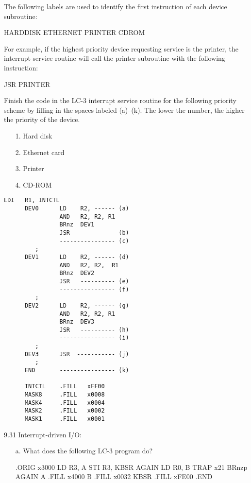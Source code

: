 \documentclass{patt}
\begin{document}
\begin{exercises}
The following labels are used to identify the first instruction of
each device subroutine:
\begin{center}
HARDDISK ETHERNET PRINTER CDROM
\end{center}

For example, if the highest priority device requesting service is the
printer, the interrupt service routine will call the printer
subroutine with the following instruction:
\begin{center}
JSR  PRINTER
\end{center}

Finish the code in the LC-3 interrupt service routine for the
following priority scheme by filling in the spaces labeled (a)--(k).
The lower the number, the higher the priority of the device.
\begin{enumerate}
\item[{\rm 1.}] Hard disk
\item[{\rm 2.}] Ethernet card
\item[{\rm 3.}] Printer
\item[{\rm 4.}] CD-ROM
\end{enumerate}

\begin{Verbatim}[fontsize=\fontsize{9}{10}\selectfont,formatcom=\color{seventyblack}]
                LDI   R1, INTCTL
      DEV0      LD    R2, ------ (a)
                AND   R2, R2, R1
                BRnz  DEV1
                JSR   ---------- (b)
                ---------------- (c)
         ;
      DEV1      LD    R2, ------ (d)
                AND   R2, R2,  R1
                BRnz  DEV2
                JSR   ---------- (e)
                ---------------- (f)
         ;
      DEV2      LD    R2, ------ (g)
                AND   R2, R2, R1
                BRnz  DEV3
                JSR   ---------- (h)
                ---------------- (i)
         ;
      DEV3      JSR  ----------- (j)
         ;
      END       ---------------- (k)

      INTCTL    .FILL   xFF00
      MASK8     .FILL   x0008
      MASK4     .FILL   x0004
      MASK2     .FILL   x0002
      MASK1     .FILL   x0001
\end{Verbatim}

\item[9.31] Interrupt-driven I/O:
\begin{enumerate}[a.]
\item[a.] What does the following LC-3 program do?
\begin{colorverbatim}
            .ORIG     x3000
            LD        R3, A
            STI       R3, KBSR
    AGAIN   LD        R0, B
            TRAP      x21
            BRnzp     AGAIN
    A      .FILL      x4000
    B      .FILL      x0032
    KBSR   .FILL      xFE00
           .END


\end{colorverbatim}
\end{enumerate}
\end{exercises}
\end{document}
